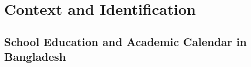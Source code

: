 \documentclass[12pt,letterpaper]{article}
\newcommand{\0}{\ensuremath{\mbox{\boldmath $0$}}}
\begin{document}




\section{Context and Identification\label{sec.id}}
\subsection{School Education and Academic Calendar in Bangladesh}
\end{document}
